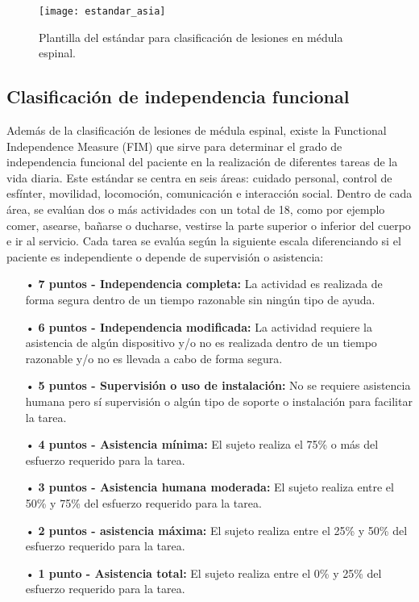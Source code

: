 \begin{figure}[!htb]
\centering
\texttt{[image: estandar\_asia]}
  \caption{Plantilla del estándar para clasificación de lesiones en médula espinal\cite{estandar_asia}.}\label{fig:estandar_asia}
\end{figure}

\subsection{Clasificación de independencia funcional}
Además de la clasificación de lesiones de médula espinal, existe la Functional Independence Measure (FIM)\cite{sci_clasificacion} que sirve para determinar el grado de independencia funcional del paciente en la realización de diferentes tareas de la vida diaria. Este estándar se centra en seis áreas: cuidado personal, control de esfínter, movilidad, locomoción, comunicación e interacción social. Dentro de cada área, se evalúan dos o más actividades con un total de 18, como por ejemplo comer, asearse, bañarse o ducharse, vestirse la parte superior o inferior del cuerpo e ir al servicio. Cada tarea se evalúa según la siguiente escala diferenciando si el paciente es independiente o depende de supervisión o asistencia:

\begin{itemize}
\item[•] \textbf{7 puntos - Independencia completa:} La actividad es realizada de forma segura dentro de un tiempo razonable sin ningún tipo de ayuda.
\item[•] \textbf{6 puntos - Independencia modificada:} La actividad requiere la asistencia de algún dispositivo y/o no es realizada dentro de un tiempo razonable y/o no es llevada a cabo de forma segura.
\item[•] \textbf{5 puntos - Supervisión o uso de instalación:} No se requiere asistencia humana pero sí supervisión o algún tipo de soporte o instalación para facilitar la tarea.
\item[•] \textbf{4 puntos - Asistencia mínima:} El sujeto realiza el 75\% o más del esfuerzo requerido para la tarea. 
\item[•] \textbf{3 puntos - Asistencia humana moderada:} El sujeto realiza entre el 50\% y 75\% del esfuerzo requerido para la tarea.
\item[•] \textbf{2 puntos - asistencia máxima:} El sujeto realiza entre el 25\% y 50\% del esfuerzo requerido para la tarea.
\item[•] \textbf{1 punto - Asistencia total:} El sujeto realiza entre el 0\% y 25\% del esfuerzo requerido para la tarea.
\end{itemize}

